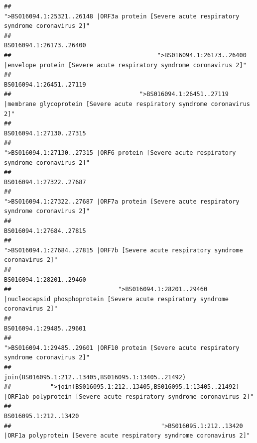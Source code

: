 \documentclass[
]{article}
\begin{document}
\begin{verbatim}
##                                            ">BS016094.1:25321..26148 |ORF3a protein [Severe acute respiratory syndrome coronavirus 2]" 
##                                                                                                                BS016094.1:26173..26400 
##                                         ">BS016094.1:26173..26400 |envelope protein [Severe acute respiratory syndrome coronavirus 2]" 
##                                                                                                                BS016094.1:26451..27119 
##                                    ">BS016094.1:26451..27119 |membrane glycoprotein [Severe acute respiratory syndrome coronavirus 2]" 
##                                                                                                                BS016094.1:27130..27315 
##                                             ">BS016094.1:27130..27315 |ORF6 protein [Severe acute respiratory syndrome coronavirus 2]" 
##                                                                                                                BS016094.1:27322..27687 
##                                            ">BS016094.1:27322..27687 |ORF7a protein [Severe acute respiratory syndrome coronavirus 2]" 
##                                                                                                                BS016094.1:27684..27815 
##                                                    ">BS016094.1:27684..27815 |ORF7b [Severe acute respiratory syndrome coronavirus 2]" 
##                                                                                                                BS016094.1:28201..29460 
##                              ">BS016094.1:28201..29460 |nucleocapsid phosphoprotein [Severe acute respiratory syndrome coronavirus 2]" 
##                                                                                                                BS016094.1:29485..29601 
##                                            ">BS016094.1:29485..29601 |ORF10 protein [Severe acute respiratory syndrome coronavirus 2]" 
##                                                                                    join(BS016095.1:212..13405,BS016095.1:13405..21492) 
##           ">join(BS016095.1:212..13405,BS016095.1:13405..21492) |ORF1ab polyprotein [Severe acute respiratory syndrome coronavirus 2]" 
##                                                                                                                  BS016095.1:212..13420 
##                                          ">BS016095.1:212..13420 |ORF1a polyprotein [Severe acute respiratory syndrome coronavirus 2]" 

\end{verbatim}
\end{document}
